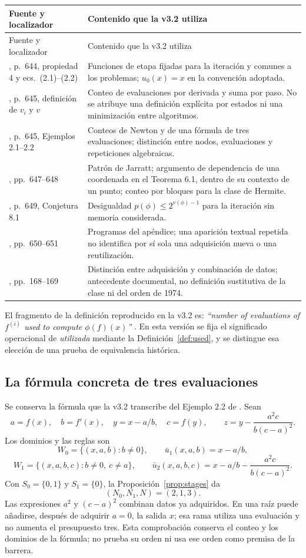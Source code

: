 \documentclass[11pt,a4paper]{article}
\numberwithin{equation}{section}
\theoremstyle{definition}
\theoremstyle{remark}
\begin{document}
\begin{longtable}{@{}p{}p{}@{}}
\toprule
Fuente y localizador & Contenido que la v3.2 utiliza\\\midrule
\endfirsthead
\toprule Fuente y localizador & Contenido que la v3.2 utiliza\\\midrule\endhead
\cite{KT1974}, p.~644, propiedad 4 y ecs.~(2.1)--(2.2)
& Funciones de etapa fijadas para la iteración y comunes a los problemas; $u_0(x)=x$ en la convención adoptada.\\[3pt]
\cite{KT1974}, p.~645, definición de $v_i$ y $v$
& Conteo de evaluaciones por derivada y suma por paso. No se atribuye una definición explícita por estados ni una minimización entre algoritmos.\\[3pt]
\cite{KT1974}, p.~645, Ejemplos 2.1--2.2
& Conteos de Newton y de una fórmula de tres evaluaciones; distinción entre nodos, evaluaciones y repeticiones algebraicas.\\[3pt]
\cite{KT1974}, pp.~647--648
& Patrón de Jarratt; argumento de dependencia de una coordenada en el Teorema 6.1, dentro de su contexto de un punto; conteo por bloques para la clase de Hermite.\\[3pt]
\cite{KT1974}, p.~649, Conjetura 8.1
& Desigualdad $p(\phi)\le2^{v(\phi)-1}$ para la iteración sin memoria considerada.\\[3pt]
\cite{KT1974}, pp.~650--651
& Programas del apéndice; una aparición textual repetida no identifica por sí sola una adquisición nueva o una reutilización.\\[3pt]
\cite{Traub1972}, pp.~168--169
& Distinción entre adquisición y combinación de datos; antecedente documental, no definición sustitutiva de la clase ni del orden de 1974.\\
\bottomrule
\end{longtable}

El fragmento de la definición reproducido en la v3.2 es: \emph{``number of evaluations of $f^{(i)}$ used to compute $\phi(f)(x)$''} \cite[p.~645]{KT1974}. En esta versión se fija el significado operacional de \emph{utilizada} mediante la Definición~\ref{def:used}, y se distingue esa elección de una prueba de equivalencia histórica.

\subsection{La fórmula concreta de tres evaluaciones}
Se conserva la fórmula que la v3.2 transcribe del Ejemplo 2.2 de \cite[p.~645]{KT1974}. Sean
\[
a=f(x),\quad b=f'(x),\quad y=x-a/b,\quad c=f(y),
\qquad z=y-\frac{a^2c}{b(c-a)^2}.
\]
Los dominios y las reglas son
\[
W_0=\{(x,a,b):b\ne0\},\qquad \bar u_1(x,a,b)=x-a/b,
\]
\[
W_1=\{(x,a,b,c):b\ne0,\ c\ne a\},\qquad
\bar u_2(x,a,b,c)=x-a/b-\frac{a^2c}{b(c-a)^2}.
\]
Con $S_0=\{0,1\}$ y $S_1=\{0\}$, la Proposición~\ref{prop:stages} da
\[
(N_0,N_1,N)=(2,1,3).
\]
Las expresiones $a^2$ y $(c-a)^2$ combinan datos ya adquiridos. En una raíz puede añadirse, después de adquirir $a=0$, la salida $x$; esa rama utiliza una evaluación y no aumenta el presupuesto tres. Esta comprobación conserva el conteo y los dominios de la fórmula; no prueba su orden ni usa ese orden como premisa de la barrera.
\end{document}

